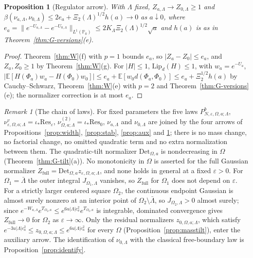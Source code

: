 \documentclass[11pt]{article}
\theoremstyle{plain}
\newtheorem{proposition}[theorem]{Proposition}
\theoremstyle{definition}
\theoremstyle{remark}
\newtheorem{remark}[theorem]{Remark}
\newcommand{\E}{\mathbb{E}}
\newcommand{\PP}{\mathbb{P}}
\newcommand{\Res}{\mathrm{Res}}
\newcommand{\Det}{\mathrm{Det}}
\begin{document}
\begin{proposition}[Regulator arrow]\label{prop:reg}
With $\Lambda$ fixed, $Z_{a,\Lambda}\to Z_{0,\Lambda}\ge1$ and
$\beta(\nu_{a,\Lambda},\nu_{0,\Lambda})\le2e_a+\Xi_2(\Lambda)^{1/2}h(a)\to0$ as $a\downarrow0$, where
$e_a=\|e^{-U_{a,\Lambda}}-e^{-U_{0,\Lambda}}\|_{L^{1}(\PP_0)}\le2K_\Lambda\Xi_2(\Lambda)^{1/2}\sqrt a$ and $h(a)$
is as in Theorem~\ref{thm:G-versions}(e).
\end{proposition}

\begin{proof}
Theorem~\ref{thm:W}(f) with $p=1$ bounds $e_a$, so $|Z_a-Z_0|\le e_a$, and $Z_a,Z_0\ge1$ by
Theorem~\ref{thm:W}(g). For $|H|\le1$, $\mathrm{Lip}_d(H)\le1$, with $w_a=e^{-U_a}$,
$|\E[H(\Phi_a)w_a-H(\Phi_0)w_0]|\le e_a+\E[w_0d(\Phi_a,\Phi_0)]\le e_a+\Xi_2^{1/2}h(a)$ by
Cauchy--Schwarz, Theorem~\ref{thm:W}(e) with $p=2$ and
Theorem~\ref{thm:G-versions}(e); the normalizer correction is at most $e_a$.
\end{proof}

\begin{remark}[The chain of laws]\label{rem:chain}
For fixed parameters the five laws
$P^{b}_{N,\varepsilon,\Omega,a;\Lambda}$, $\nu^{v}_{\varepsilon,\Omega,a;\Lambda}=\iota_*\Res_\varepsilon$,
$\nu^{(2)}_{\Omega,a;\Lambda}=\iota_*\Res_0$, $\nu_{a,\Lambda}$ and $\nu_{0,\Lambda}$ are joined by the four
arrows of Propositions~\ref{prop:width}, \ref{prop:stab}, \ref{prop:aux} and
\ref{prop:reg}; there is no mass change, no factorial change, no omitted
quadratic term and no extra normalization between them. The quadratic-tilt
normalizer $\Det_{\Omega,a}$ is nondecreasing in $\Omega$ (Theorem~\ref{thm:G-tilt}(a)).
No monotonicity in $\Omega$ is asserted for the full Gaussian normalizer
$Z_{\mathrm{full}}=\Det_{\Omega,a}z_{\varepsilon,\Omega,a;\Lambda}$, and none holds in general at a fixed
$\varepsilon>0$. For $\Omega_1=\bar\Lambda$ the outer integral $J_{\Omega_1,\Lambda}$ vanishes,
so $Z_{\mathrm{full}}$ for $\Omega_1$ does not depend on $\varepsilon$. For a strictly larger
centered square $\Omega_2$, the continuous endpoint Gaussian is almost surely
nonzero at an interior point of $\Omega_2\setminus\bar\Lambda$, so $J_{\Omega_2,\Lambda}>0$ almost
surely; since $e^{-W_{a,\Lambda}}e^{T_{\Omega_2,a}}\le e^{6u|\Lambda|c_a^{2}}e^{T_{\Omega_2,a}}$ is
integrable, dominated convergence gives $Z_{\mathrm{full}}\to0$ for $\Omega_2$ as
$\varepsilon\to\infty$. Only the residual normalizers $z_{0,\Omega,a;\Lambda}$, which satisfy
$e^{-3u|\Lambda|c_a^{2}}\le z_{0,\Omega,a;\Lambda}\le e^{6u|\Lambda|c_a^{2}}$ for every $\Omega$
(Proposition~\ref{prop:masstilt}), enter the auxiliary arrow. The identification of $\nu_{0,\Lambda}$ with
the classical free-boundary law is Proposition~\ref{prop:identify}.
\end{remark}
\end{document}
